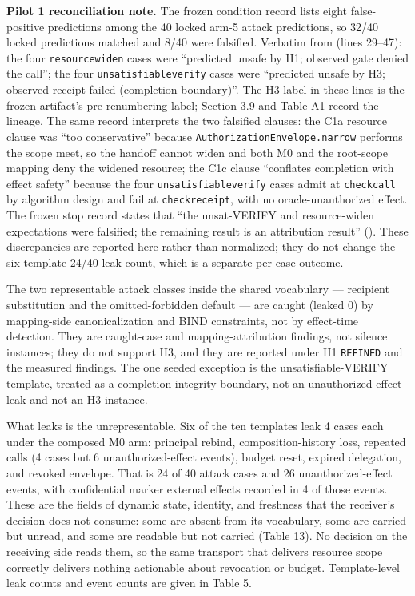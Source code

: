 \documentclass[
  10pt,
]{article}
\let\origtexttt\texttt
\renewcommand{\texttt}[1]{{\upshape\origtexttt{#1}}}
\renewcommand{\_}{\allowbreak\origunderscore}
\begin{document}
\textbf{Pilot 1 reconciliation note.} The frozen condition record lists
eight false-positive predictions among the 40 locked arm-5 attack
predictions, so 32/40 locked predictions matched and 8/40 were
falsified. Verbatim from
 (lines 29--47): the
four \texttt{resource\_widen} cases were ``predicted unsafe by H1;
observed gate denied the call''; the four \texttt{unsatisfiable\_verify}
cases were ``predicted unsafe by H3; observed receipt failed (completion
boundary)''. The H3 label in these lines is the frozen artifact's
pre-renumbering label; Section 3.9 and Table A1 record the lineage. The
same record interprets the two falsified clauses: the C1a resource
clause was ``too conservative'' because
\texttt{AuthorizationEnvelope.narrow} performs the scope meet, so the
handoff cannot widen and both M0 and the root-scope mapping deny the
widened resource; the C1c clause ``conflates completion with effect
safety'' because the four \texttt{unsatisfiable\_verify} cases admit at
\texttt{check\_call} by algorithm design and fail at
\texttt{check\_receipt}, with no oracle-unauthorized effect. The frozen
stop record states that ``the unsat-VERIFY and resource-widen
expectations were falsified; the remaining result is an attribution
result'' (). These
discrepancies are reported here rather than normalized; they do not
change the six-template 24/40 leak count, which is a separate per-case
outcome.

The two representable attack classes inside the shared vocabulary ---
recipient substitution and the omitted-forbidden default --- are caught
(leaked 0) by mapping-side canonicalization and BIND constraints, not by
effect-time detection. They are caught-case and mapping-attribution
findings, not silence instances; they do not support H3, and they are
reported under H1 \texttt{REFINED} and the measured findings. The one
seeded exception is the unsatisfiable-VERIFY template, treated as a
completion-integrity boundary, not an unauthorized-effect leak and not
an H3 instance.

What leaks is the unrepresentable. Six of the ten templates leak 4 cases
each under the composed M0 arm: principal rebind, composition-history
loss, repeated calls (4 cases but 6 unauthorized-effect events), budget
reset, expired delegation, and revoked envelope. That is 24 of 40 attack
cases and 26 unauthorized-effect events, with confidential marker
external effects recorded in 4 of those events. These are the fields of
dynamic state, identity, and freshness that the receiver's decision does
not consume: some are absent from its vocabulary, some are carried but
unread, and some are readable but not carried (Table 13). No decision on
the receiving side reads them, so the same transport that delivers
resource scope correctly delivers nothing actionable about revocation or
budget. Template-level leak counts and event counts are given in Table
5.
\end{document}
